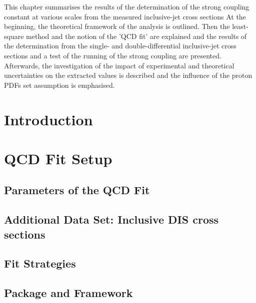 This chapter summarises the results of the determination of the strong coupling constant at various scales from the measured inclusive-jet cross sections
At the beginning, the theoretical framework of the analysis is outlined. Then the least-square method and the notion of the 'QCD fit' are explained and the results of the \asz determination from the single- and double-differential inclusive-jet cross sections and a test of the running of the strong coupling are presented. Afterwards, the investigation of the impact of experimental and theoretical uncertainties on the extracted \asz values is described and the influence of the proton PDFs set assumption is emphasised. %

\section{Introduction}
\label{sec:qcdfitintro}


\section{QCD Fit Setup}
\label{sec:fitsettings}


\subsection{Parameters of the QCD Fit}
\label{subsec:qcdfitparams}


\subsection{Additional Data Set: Inclusive DIS cross sections}
\label{subsec:inclusivedisdata}


\subsection{Fit Strategies}
\label{subsec:fitstategy}


\subsection{\herafitter Package and \fastnlo Framework}
\label{subsec:herfitter}


